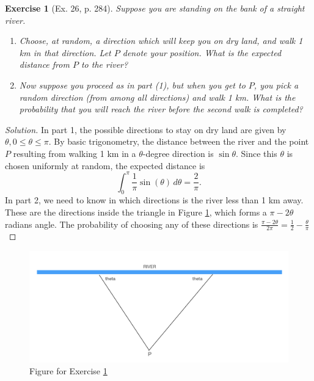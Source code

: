 \documentclass[letterpaper, 10 pt, conference]{article}
\newtheorem{ex}{Exercise}
\begin{document}
\begin{ex}[Ex. 26, p. 284] \label{ex:river}
Suppose you are standing on the bank of a straight river.
\begin{enumerate}
	\item Choose, at random, a direction which will keep you on dry land, and walk 1 km in that direction. Let $P$ denote your position. What is the expected distance from $P$ to the river?
	\item Now suppose you proceed as in part (1), but when you get to $P$, you pick a random direction (from among \textit{all} directions) and walk 1 km. What is the probability that you will reach the river before the second walk is completed?
\end{enumerate}
\end{ex}
\begin{proof}[Solution]
	In part 1, the possible directions to stay on dry land are given by $\theta, 0 \leq \theta \leq \pi$. By basic trigonometry, the distance between the river and the point $P$ resulting from walking 1 km in a $\theta$-degree direction is $\sin \theta$. Since this $\theta$ is chosen uniformly at random, the expected distance is 
	\begin{equation}
		\int_{0}^{\pi} \frac{1}{\pi} \sin( \theta) \, d\theta = \frac{2}{\pi}.
	\end{equation}
	In part 2, we need to know in which directions is the river less than 1 km away. These are the directions inside the triangle in Figure \ref{fig:river}, which forms a $\pi - 2\theta$ radians angle. The probability of choosing any of these directions is $\frac{\pi-2\theta}{2\pi} = \frac{1}{2} - \frac{\theta}{\pi}$
\end{proof}

\begin{figure}
	\centering
	\includegraphics[width=0.6\linewidth]{river_problem}
	\caption{Figure for Exercise \ref{ex:river}}
	\label{fig:river}
\end{figure}
\end{document}
